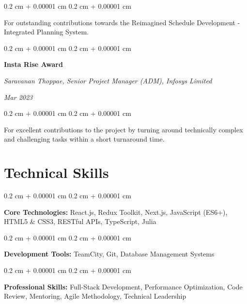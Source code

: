 \documentclass[10pt, letterpaper]{article}
\newenvironment{onecolentry}{
    \begin{adjustwidth}{
        0.2 cm + 0.00001 cm
    }{
        0.2 cm + 0.00001 cm
    }
}{
    \end{adjustwidth}
}
\newenvironment{twocolentry}[2][]{
    \onecolentry
    \def\secondColumn{#2}
    \setcolumnwidth{\fill, 4.5 cm}
    \begin{paracol}{2}
}{
    \switchcolumn \raggedleft \secondColumn
    \end{paracol}
    \endonecolentry
}
\begin{document}
        \vspace{0.10 cm}
        \begin{onecolentry}
            For outstanding contributions towards the Reimagined Schedule Development - Integrated Planning System.
        \end{onecolentry}

        \vspace{0.2 cm}

        \begin{twocolentry}{
        \textit{Mar 2023}}
            \textbf{Insta Rise Award}
            
            \textit{Saravanan Thoppae, Senior Project Manager (ADM), Infosys Limited}
        \end{twocolentry}

        \vspace{0.10 cm}
        \begin{onecolentry}
            For excellent contributions to the project by turning around technically complex and challenging tasks within a short turnaround time.
        \end{onecolentry}

    \section{Technical Skills}
        \begin{onecolentry}
            \textbf{Core Technologies:} React.js, Redux Toolkit, Next.js, JavaScript (ES6+), HTML5 \& CSS3, RESTful APIs, TypeScript, Julia
        \end{onecolentry}

        \vspace{0.2 cm}

        \begin{onecolentry}
            \textbf{Development Tools:} TeamCity, Git, Database Management Systems
        \end{onecolentry}

        \vspace{0.2 cm}

        \begin{onecolentry}
            \textbf{Professional Skills:} Full-Stack Development, Performance Optimization, Code Review, Mentoring, Agile Methodology, Technical Leadership
        \end{onecolentry}
\end{document}
